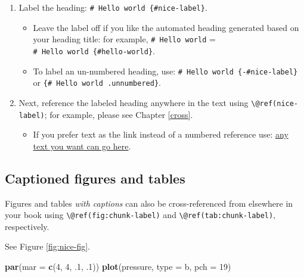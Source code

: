 \documentclass[
  xelatex, ja=standard]{bxjsbook}
\newenvironment{Shaded}{\begin{snugshade}}{\end{snugshade}}
\newcommand{\AttributeTok}[1]{\textcolor[rgb]{0.13,0.29,0.53}{#1}}
\newcommand{\DecValTok}[1]{\textcolor[rgb]{0.00,0.00,0.81}{#1}}
\newcommand{\FunctionTok}[1]{\textcolor[rgb]{0.13,0.29,0.53}{\textbf{#1}}}
\newcommand{\NormalTok}[1]{#1}
\newcommand{\StringTok}[1]{\textcolor[rgb]{0.31,0.60,0.02}{#1}}
\providecommand{\tightlist}{%
  \setlength{\itemsep}{0pt}\setlength{\parskip}{0pt}}
\theoremstyle{definition}
\theoremstyle{definition}
\theoremstyle{definition}
\theoremstyle{definition}
\theoremstyle{remark}
\begin{document}
\begin{enumerate}
\def\labelenumi{\arabic{enumi}.}
\tightlist
\item
  Label the heading: \texttt{\#\ Hello\ world\ \{\#nice-label\}}.

  \begin{itemize}
  \tightlist
  \item
    Leave the label off if you like the automated heading generated based on your heading title: for example, \texttt{\#\ Hello\ world} = \texttt{\#\ Hello\ world\ \{\#hello-world\}}.
  \item
    To label an un-numbered heading, use: \texttt{\#\ Hello\ world\ \{-\#nice-label\}} or \texttt{\{\#\ Hello\ world\ .unnumbered\}}.
  \end{itemize}
\item
  Next, reference the labeled heading anywhere in the text using \texttt{\textbackslash{}@ref(nice-label)}; for example, please see Chapter \ref{cross}.

  \begin{itemize}
  \tightlist
  \item
    If you prefer text as the link instead of a numbered reference use: \protect\hyperlink{cross}{any text you want can go here}.
  \end{itemize}
\end{enumerate}

\hypertarget{captioned-figures-and-tables}{%
\subsection{Captioned figures and tables}\label{captioned-figures-and-tables}}

Figures and tables \emph{with captions} can also be cross-referenced from elsewhere in your book using \texttt{\textbackslash{}@ref(fig:chunk-label)} and \texttt{\textbackslash{}@ref(tab:chunk-label)}, respectively.

See Figure \ref{fig:nice-fig}.

\begin{Shaded}
\begin{Highlighting}[]
\FunctionTok{par}\NormalTok{(}\AttributeTok{mar =} \FunctionTok{c}\NormalTok{(}\DecValTok{4}\NormalTok{, }\DecValTok{4}\NormalTok{, .}\DecValTok{1}\NormalTok{, .}\DecValTok{1}\NormalTok{))}
\FunctionTok{plot}\NormalTok{(pressure, }\AttributeTok{type =} \StringTok{\textquotesingle{}b\textquotesingle{}}\NormalTok{, }\AttributeTok{pch =} \DecValTok{19}\NormalTok{)}
\end{Highlighting}
\end{Shaded}
\end{document}
